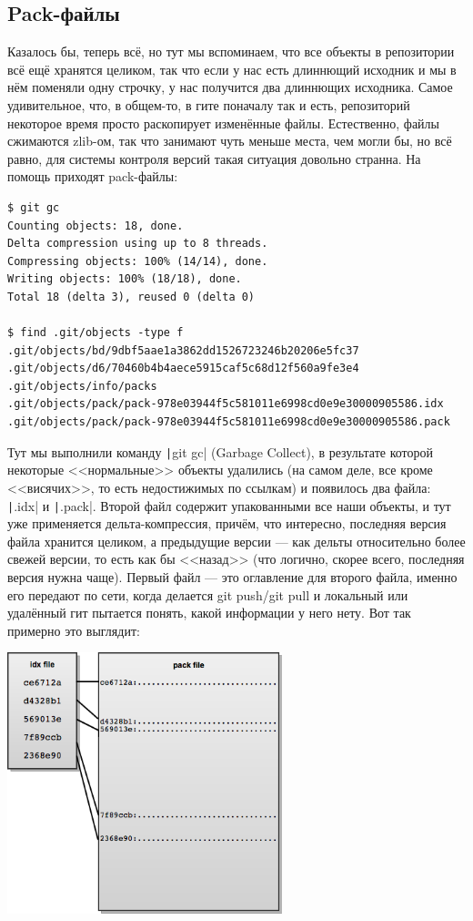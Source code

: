 \documentclass[a5paper]{article}
\begin{document}
\subsection{Pack-файлы}

Казалось бы, теперь всё, но тут мы вспоминаем, что все объекты в репозитории всё ещё хранятся целиком, так что если у нас есть длиннющий исходник и мы в нём поменяли одну строчку, у нас получится два длиннющих исходника. Самое удивительное, что, в общем-то, в гите поначалу так и есть, репозиторий некоторое время просто раскопирует изменённые файлы. Естественно, файлы сжимаются zlib-ом, так что занимают чуть меньше места, чем могли бы, но всё равно, для системы контроля версий такая ситуация довольно странна. На помощь приходят pack-файлы:

\begin{verbatim}
$ git gc
Counting objects: 18, done.
Delta compression using up to 8 threads.
Compressing objects: 100% (14/14), done.
Writing objects: 100% (18/18), done.
Total 18 (delta 3), reused 0 (delta 0)

$ find .git/objects -type f
.git/objects/bd/9dbf5aae1a3862dd1526723246b20206e5fc37
.git/objects/d6/70460b4b4aece5915caf5c68d12f560a9fe3e4
.git/objects/info/packs
.git/objects/pack/pack-978e03944f5c581011e6998cd0e9e30000905586.idx
.git/objects/pack/pack-978e03944f5c581011e6998cd0e9e30000905586.pack
\end{verbatim}

Тут мы выполнили команду \texttt|git gc| (Garbage Collect), в результате которой некоторые <<нормальные>> объекты удалились (на самом деле, все кроме <<висячих>>, то есть недостижимых по ссылкам) и появилось два файла: \texttt|.idx| и \texttt|.pack|. Второй файл содержит упакованными все наши объекты, и тут уже применяется дельта-компрессия, причём, что интересно, последняя версия файла хранится целиком, а предыдущие версии --- как дельты относительно более свежей версии, то есть как бы <<назад>> (что логично, скорее всего, последняя версия нужна чаще). Первый файл --- это оглавление для второго файла, именно его передают по сети, когда делается git push/git pull и локальный или удалённый гит пытается понять, какой информации у него нету. Вот так примерно это выглядит:

\begin{center}
    \includegraphics[width=0.6\textwidth]{gitPackFiles.png}
\end{center}
\end{document}
